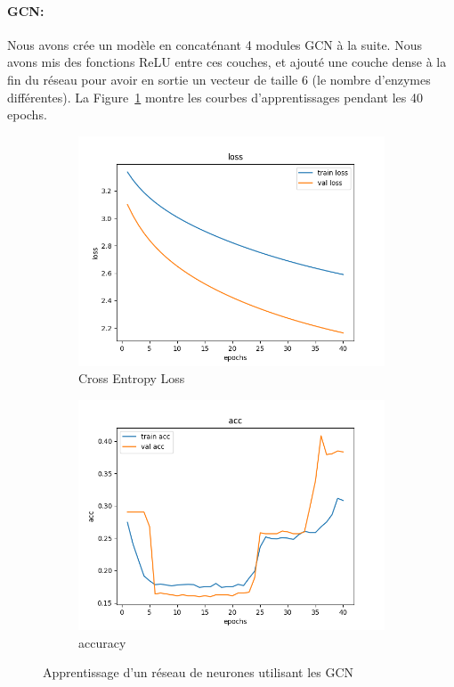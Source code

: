 \documentclass[a4paper]{article}
\begin{document}
\paragraph{GCN:}
Nous avons crée un modèle en concaténant 4 modules GCN à la suite. Nous avons mis des fonctions ReLU entre ces couches, et ajouté une couche dense à la fin du réseau pour avoir en sortie un vecteur de taille 6 (le nombre d'enzymes différentes). La Figure~\ref{fig: GCN} montre les courbes d'apprentissages pendant les 40 epochs.

\begin{figure}[ht]
    \centering
    \begin{subfigure}{0.47\textwidth}
      \includegraphics[width=\linewidth]{../results/GCN_0/loss.png}
      \caption{Cross Entropy Loss}
    \end{subfigure}
    \hfill
    \begin{subfigure}{0.47\textwidth}
      \includegraphics[width=\linewidth]{../results/GCN_0/acc.png}
      \caption{accuracy}
    \end{subfigure}
    \caption{Apprentissage d'un réseau de neurones utilisant les GCN}
    \label{fig: GCN}
\end{figure}
\end{document}
